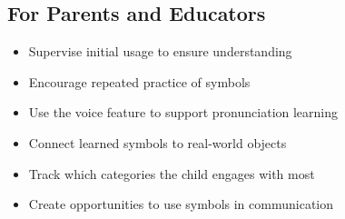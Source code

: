 \documentclass[12pt,a4paper]{article}
\begin{document}

\subsection{For Parents and Educators}
\begin{itemize}
    \item Supervise initial usage to ensure understanding
    \item Encourage repeated practice of symbols
    \item Use the voice feature to support pronunciation learning
    \item Connect learned symbols to real-world objects
    \item Track which categories the child engages with most
    \item Create opportunities to use symbols in communication
\end{itemize}
\end{document}
